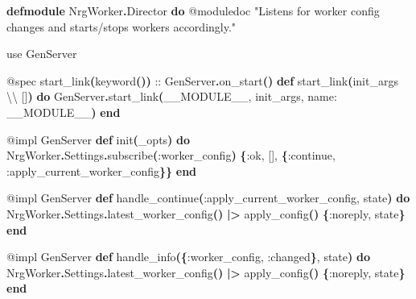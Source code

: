 \documentclass[11pt,a4paper,greek,twoside]{template-xe}
\newenvironment{Shaded}{\begin{english}\begin{snugshade}}{\end{snugshade}\end{english}}
\newcommand{\ConstantTok}[1]{\textcolor[rgb]{0.56,0.35,0.01}{#1}}
\newcommand{\FunctionTok}[1]{\textcolor[rgb]{0.13,0.29,0.53}{\textbf{#1}}}
\newcommand{\ImportTok}[1]{#1}
\newcommand{\KeywordTok}[1]{\textcolor[rgb]{0.13,0.29,0.53}{\textbf{#1}}}
\newcommand{\NormalTok}[1]{#1}
\newcommand{\OperatorTok}[1]{\textcolor[rgb]{0.81,0.36,0.00}{\textbf{#1}}}
\newcommand{\OtherTok}[1]{\textcolor[rgb]{0.56,0.35,0.01}{#1}}
\newcommand{\StringTok}[1]{\textcolor[rgb]{0.31,0.60,0.02}{#1}}
\newcommand{\VariableTok}[1]{\textcolor[rgb]{0.00,0.00,0.00}{#1}}
\begin{document}
\begin{Shaded}
\begin{Highlighting}[]
\KeywordTok{defmodule} \ConstantTok{NrgWorker}\OperatorTok{.}\ConstantTok{Director} \KeywordTok{do}
  \OtherTok{@moduledoc} \StringTok{"Listens for worker config changes and starts/stops workers accordingly."}

  \ImportTok{use} \ConstantTok{GenServer}

  \OtherTok{@spec}\NormalTok{ start\_link}\FunctionTok{(}\NormalTok{keyword}\FunctionTok{())}\NormalTok{ :: }\ConstantTok{GenServer}\OperatorTok{.}\NormalTok{on\_start}\FunctionTok{()}
  \KeywordTok{def}\NormalTok{ start\_link}\FunctionTok{(}\NormalTok{init\_args \textbackslash{}\textbackslash{} }\OtherTok{[]}\FunctionTok{)} \KeywordTok{do}
    \ConstantTok{GenServer}\OperatorTok{.}\NormalTok{start\_link}\FunctionTok{(}\ConstantTok{\_\_MODULE\_\_}\NormalTok{, init\_args, }\VariableTok{name:} \ConstantTok{\_\_MODULE\_\_}\FunctionTok{)}
  \KeywordTok{end}

  \OtherTok{@impl} \ConstantTok{GenServer}
  \KeywordTok{def}\NormalTok{ init}\FunctionTok{(}\NormalTok{\_opts}\FunctionTok{)} \KeywordTok{do}
    \ConstantTok{NrgWorker}\OperatorTok{.}\ConstantTok{Settings}\OperatorTok{.}\NormalTok{subscribe}\FunctionTok{(}\VariableTok{:worker\_config}\FunctionTok{)}
    \FunctionTok{\{}\VariableTok{:ok}\NormalTok{, }\OtherTok{[]}\NormalTok{, }\FunctionTok{\{}\VariableTok{:continue}\NormalTok{, }\VariableTok{:apply\_current\_worker\_config}\FunctionTok{\}\}}
  \KeywordTok{end}

  \OtherTok{@impl} \ConstantTok{GenServer}
  \KeywordTok{def}\NormalTok{ handle\_continue}\FunctionTok{(}\VariableTok{:apply\_current\_worker\_config}\NormalTok{, state}\FunctionTok{)} \KeywordTok{do}
    \ConstantTok{NrgWorker}\OperatorTok{.}\ConstantTok{Settings}\OperatorTok{.}\NormalTok{latest\_worker\_config}\FunctionTok{()} \OperatorTok{|\textgreater{}}\NormalTok{ apply\_config}\FunctionTok{()}
    \FunctionTok{\{}\VariableTok{:noreply}\NormalTok{, state}\FunctionTok{\}}
  \KeywordTok{end}

  \OtherTok{@impl} \ConstantTok{GenServer}
  \KeywordTok{def}\NormalTok{ handle\_info}\FunctionTok{(\{}\VariableTok{:worker\_config}\NormalTok{, }\VariableTok{:changed}\FunctionTok{\}}\NormalTok{, state}\FunctionTok{)} \KeywordTok{do}
    \ConstantTok{NrgWorker}\OperatorTok{.}\ConstantTok{Settings}\OperatorTok{.}\NormalTok{latest\_worker\_config}\FunctionTok{()} \OperatorTok{|\textgreater{}}\NormalTok{ apply\_config}\FunctionTok{()}
    \FunctionTok{\{}\VariableTok{:noreply}\NormalTok{, state}\FunctionTok{\}}
  \KeywordTok{end}


\end{Highlighting}
\end{Shaded}
\end{document}
